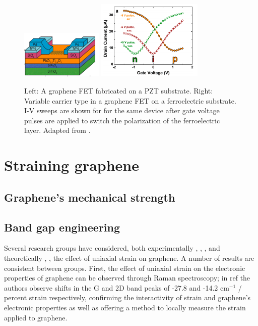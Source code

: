 \documentclass[edeposit,fullpage,draftthesis]{uiucthesis2009}
\begin{document}
            \begin{figure}
            \centering
            \includegraphics[width=0.35\textwidth]{images/background/ChristophDevice.png}
            \includegraphics[width=0.45\textwidth]{images/background/ChristophFig4.png}
            \caption[Graphene on ferroelectric substrates]{Left: A graphene FET fabricated on a PZT substrate. Right: Variable carrier type in a graphene FET on a ferroelectric substrate. I-V sweeps are shown for for the same device after gate voltage pulses are applied to switch the polarization of the ferroelectric layer. Adapted from \cite{Baeumer2013}.}
            \label{fig:GonPZT}
            \end{figure}
        
        
    \section{Straining graphene}
    
        \subsection{Graphene's mechanical strength}
    
        \subsection{Band gap engineering}
        Several research groups have considered, both experimentally \cite{Ni2008}, \cite{Kim2009}, \cite{Mohiuddin2009}, \cite{Zang2013} and theoretically \cite{Pereira2009}, \cite{Low2011}, the effect of uniaxial strain on graphene. A number of results are consistent between groups. First, the effect of uniaxial strain on the electronic properties of graphene can be observed through Raman spectroscopy; in ref \cite{Ni2008} the authors observe shifts in the G and 2D band peaks of -27.8 and -14.2 cm$^{-1}$ / percent strain respectively, confirming the interactivity of strain and graphene's electronic properties as well as offering a method to locally measure the strain applied to graphene.
    
\end{document}
